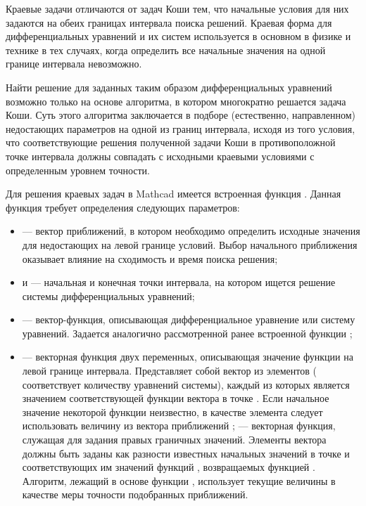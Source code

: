 Краевые задачи отличаются от задач Коши тем, что начальные условия для них задаются на обеих границах интервала поиска решений. Краевая форма для дифференциальных уравнений и их систем используется в основном в физике и технике в тех случаях, когда определить все начальные значения на одной границе интервала невозможно. 

Найти решение для заданных таким образом дифференциальных уравнений возможно только на основе алгоритма, в котором многократно решается задача Коши. Суть этого алгоритма заключается в подборе (естественно, направленном) недостающих параметров на одной из границ интервала, исходя из того условия, что соответствующие решения полученной задачи Коши в противоположной точке интервала должны совпадать с исходными краевыми условиями с определенным уровнем точности.

Для решения краевых задач в Mathcad имеется встроенная функция . Данная функция требует определения следующих параметров:
\begin{itemize}[label={}]
	\item {} --- вектор приближений, в котором необходимо определить исходные значения для недостающих на левой границе условий. Выбор начального приближения оказывает влияние на сходимость и время поиска решения;
	\item {} и  --- начальная и конечная точки интервала, на котором ищется решение системы дифференциальных уравнений;
	\item {} --- вектор-функция, описывающая дифференциальное уравнение или систему уравнений. Задается аналогично рассмотренной ранее встроенной функции ;
	\item {} --- векторная функция двух переменных, описывающая значение функции на левой границе интервала. Представляет собой вектор из  элементов ( соответствует количеству уравнений системы), каждый из которых является значением соответствующей функции вектора  в точке . Если начальное значение некоторой функции неизвестно, в качестве элемента  следует использовать величину из вектора приближений ;
	 --- векторная функция, служащая для задания правых граничных значений. Элементы вектора  должны быть заданы как разности известных начальных значений в точке  и соответствующих им значений функций , возвращаемых функцией . Алгоритм, лежащий в основе функции , использует текущие величины  в качестве меры точности подобранных приближений. 
\end{itemize}

